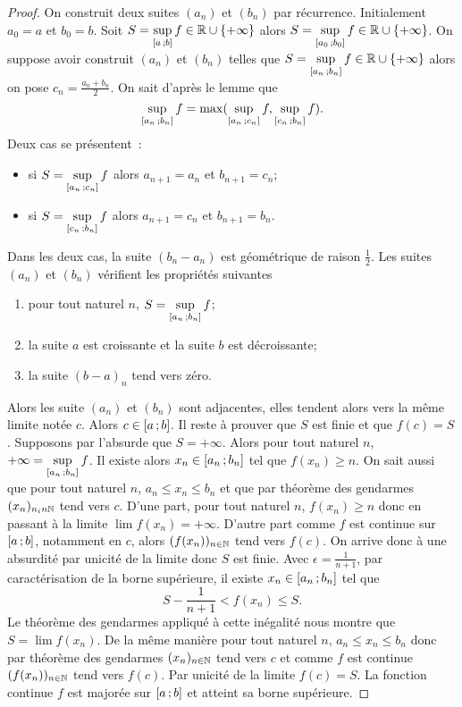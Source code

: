 \begin{proof}
  On construit deux suites $(a_n)$ et $(b_n)$ par récurrence. Initialement $a_0=a$ et $b_0=b$. Soit $S=\sup\limits_{\left[ a \, ;  b \right]}f \in \mathbb{R}\cup\{+\infty\}$ alors $S=\sup\limits_{\left[ a_0 \, ;  b_0 \right]}f \in \mathbb{R}\cup\{+\infty\}$. On suppose avoir construit $(a_n)$ et $(b_n)$ telles que $S=\sup\limits_{\left[ a_n \, ;  b_n \right]}f \in \mathbb{R}\cup\{+\infty\}$ alors on pose $c_n=\frac{a_n+b_n}{2}$. On sait d'après le lemme que 
  \begin{equation}
    \sup\limits_{\left[ a_n \, ;  b_n \right]}f=\max(\sup\limits_{\left[ a_n \, ;  c_n \right]}f,\sup\limits_{\left[ c_n \, ;  b_n \right]}f).
  \end{equation}
  Deux cas se présentent~:
  \begin{itemize}
  \item si $S=\sup\limits_{\left[ a_n \, ;  c_n \right]}f$ alors $a_{n+1}=a_n$ et $b_{n+1}=c_n$;
  \item si $S=\sup\limits_{\left[ c_n \, ;  b_n \right]}f$ alors $a_{n+1}=c_n$ et $b_{n+1}=b_n$.
  \end{itemize}
  Dans les deux cas, la suite $(b_n-a_n)$ est géométrique de raison $\frac{1}{2}$. Les suites $(a_n)$ et $(b_n)$ vérifient les propriétés suivantes
  \begin{enumerate}
  \item pour tout naturel $n$, $S=\sup\limits_{\left[ a_n \, ;  b_n \right]}f$;
  \item la suite $a$ est croissante et la suite $b$ est décroissante;
  \item la suite $(b-a)_n$ tend vers zéro.
  \end{enumerate}
  Alors les suite $(a_n)$ et $(b_n)$ sont adjacentes, elles tendent alors vers la même limite notée $c$. Alors $c \in \left[ a \, ;  b \right]$. Il reste à prouver que $S$ est finie et que $f(c)=S$. Supposons par l'absurde que $S=+\infty$. Alors pour tout naturel $n$, $+\infty = \sup\limits_{\left[ a_n \, ;  b_n \right]}f$. Il existe alors $x_n \in \left[ a_n \, ;  b_n \right]$ tel que $f(x_n) \geq n$. On sait aussi que pour tout naturel $n$, $a_n \leq x_n \leq b_n$ et que par théorème des gendarmes $(x_n)_{n _in \mathbb{N}}$ tend vers $c$. D'une part, pour tout naturel $n$, $f(x_n) \geq n$ donc en passant à la limite $\lim f(x_n) = +\infty$. D'autre part comme $f$ est continue sur $\left[ a \, ;  b \right]$, notamment en $c$, alors $(f(x_n))_{n\in \mathbb{N}}$ tend vers $f(c)$. On arrive donc à une absurdité par unicité de la limite donc $S$ est finie. Avec $\epsilon=\frac{1}{n+1}$, par caractérisation de la borne supérieure, il existe $x_n \in \left[ a_n \, ;  b_n \right]$ tel que
  \begin{equation}
    S-\frac{1}{n+1} < f(x_n) \leq S.
  \end{equation}
  Le théorème des gendarmes appliqué à cette inégalité nous montre que $S=\lim f(x_n)$. De la même manière pour tout naturel $n$, $a_n \leq x_n \leq b_n$ donc par théorème des gendarmes $(x_n)_{n\in \mathbb{N}}$ tend vers $c$ et comme $f$ est continue $(f(x_n))_{n\in \mathbb{N}}$ tend vers $f(c)$. Par unicité de la limite $f(c)=S$. La fonction continue $f$ est majorée sur $\left[ a \, ;  b \right]$ et atteint sa borne supérieure.
\end{proof}

